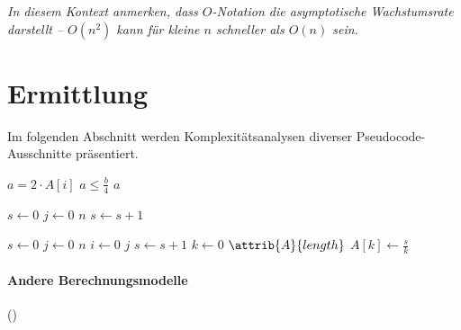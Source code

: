 \emph{In diesem Kontext anmerken, dass $O$-Notation die \emph{asymptotische Wachstumsrate} darstellt -- $O(n^2)$ kann für kleine $n$ schneller als $O(n)$ sein.}





\section{Ermittlung}

Im folgenden Abschnitt werden Komplexitätsanalysen diverser Pseudocode-Ausschnitte präsentiert.

\begin{codebox}
    \li $a = 2 \cdot A[i]$
    \li \If $a \leq \frac{b}{4}$
    \li     \Then
                \Return $a$
            \End
\end{codebox}

\begin{codebox}
    \li $s \gets 0$
    \li \For $j \gets 0$ \To $n$
    \li     \Do
                $s \gets s + 1$
            \End
\end{codebox}

\begin{codebox}
    \li $s \gets 0$
    \li \For $j \gets 0$ \To $n$
    \li     \Do
                \For $i \gets 0$ \To $j$
    \li             \Do
                        $s \gets s + 1$
                    \End
            \End
    \li \For $k \gets 0$ \To $\attrib{A}{length}$
    \li     \Do
                $A[k] \gets \frac{s}{k}$
            \End
\end{codebox}

\paragraph{Andere Berechnungsmodelle} \cite{ahu1974} ()
